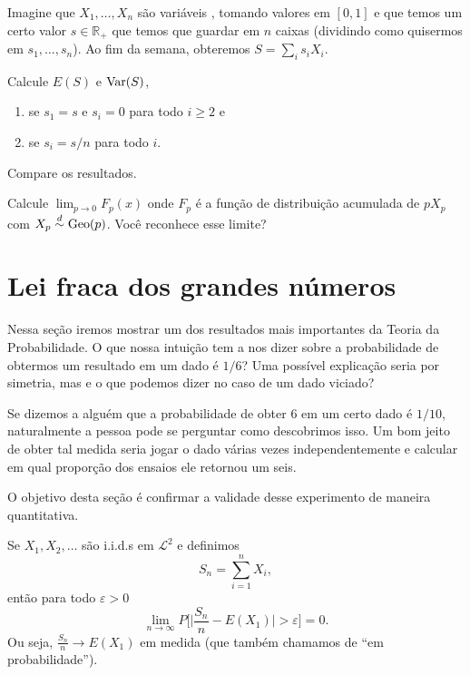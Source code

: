 \begin{exercise}
  Imagine que $X_1, \dots, X_n$ são variáveis \iid, tomando valores em $[0,1]$ e que temos um certo valor $s \in \mathbb{R}_+$ que temos que guardar em $n$ caixas (dividindo como quisermos em $s_1, \dots, s_n$).
  Ao fim da semana, obteremos $S = \sum_i s_i X_i$.

  Calcule $E(S)$ e $\operatorname{Var}(S)$,
  \begin{enumerate}[\quad a)]
  \item se $s_1 = s$ e $s_i = 0$ para todo $i \geq 2$ e
  \item se $s_i = s/n$ para todo $i$.
  \end{enumerate}
  Compare os resultados.
\end{exercise}

\begin{exercise}
  Calcule $\lim_{p \to 0} F_p(x)$ onde $F_p$ é a função de distribuição acumulada de $p X_p$ com $X_p \overset{d}\sim \operatorname{Geo}(p)$.
  Você reconhece esse limite?
\end{exercise}

\section{Lei fraca dos grandes números}

Nessa seção iremos mostrar um dos resultados mais importantes da Teoria da Probabilidade.
O que nossa intuição tem a nos dizer sobre a probabilidade de obtermos um resultado em um dado é $1/6$?
Uma possível explicação seria por simetria, mas e o que podemos dizer no caso de um dado viciado?

Se dizemos a alguém que a probabilidade de obter $6$ em um certo dado é $1/10$, naturalmente a pessoa pode se perguntar como descobrimos isso.
Um bom jeito de obter tal medida seria jogar o dado várias vezes independentemente e calcular em qual proporção dos ensaios ele retornou um seis.

O objetivo desta seção é confirmar a validade desse experimento de maneira quantitativa.

\begin{theorem}
  \label{t:lei_fraca}
  Se $X_1, X_2, \dots$ são i.i.d.s em $\mathcal{L}^2$ e definimos
  \begin{equation}
    S_n = \sum_{i=1}^n X_i,
  \end{equation}
  então para todo $\varepsilon > 0$
  \begin{equation}
    \lim_{n \to \infty} P \Big[\Big| \frac{S_n}{n} - E(X_1)\Big| > \varepsilon \Big] = 0.
  \end{equation}
  Ou seja, $\tfrac{S_n}{n} \to E(X_1)$ em medida (que também chamamos de ``em probabilidade'').
\end{theorem}

